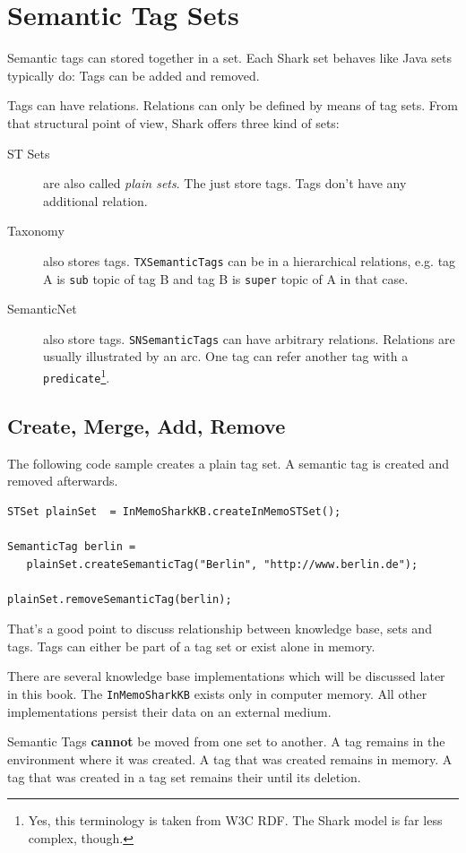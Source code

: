 \chapter{Semantic Tag Sets}
Semantic tags can stored together in a set. Each Shark set behaves like Java sets typically do: Tags can be added and removed.

Tags can have relations. Relations can only be defined by means of tag
sets. From that structural point of view, Shark offers three kind of sets:

\begin{description}
\item[ST Sets] are also called {\it plain sets}. The just store tags. Tags don't have any additional relation.
\item[Taxonomy] also stores tags. {\tt TXSemanticTags} can be in a hierarchical
relations, e.g. tag A is {\tt sub} topic of tag B and tag B is {\tt super} topic of A in that case.
\item[SemanticNet] also store tags. {\tt SNSemanticTags} can have arbitrary relations. Relations are usually illustrated by an arc. One tag can refer another tag with a {\tt predicate}\footnote{Yes, this terminology is taken from W3C RDF. The Shark model is far less complex, though.}.
\end{description}

\section{Create, Merge, Add, Remove}
The following code sample creates a plain tag set. A semantic tag is created and removed afterwards.

\begin{verbatim}
STSet plainSet  = InMemoSharkKB.createInMemoSTSet();

SemanticTag berlin =
   plainSet.createSemanticTag("Berlin", "http://www.berlin.de");

plainSet.removeSemanticTag(berlin);
\end{verbatim}

That's a good point to discuss relationship between knowledge base, sets and
tags. Tags can either be part of a tag set or exist alone in memory.

There are several knowledge base implementations which will be discussed later in this book. The {\verb|InMemoSharkKB|} exists only in computer memory. All other implementations persist their data on an external medium.

Semantic Tags {\bf cannot} be moved from one set to another. A tag remains in the environment where it was created. A tag that was created remains in memory. A tag that was created in a tag set remains their until its deletion.

